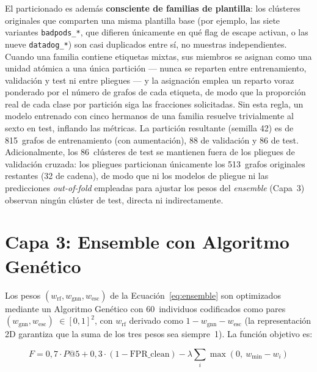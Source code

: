 El particionado es además \textbf{consciente de familias de plantilla}: los
clústeres originales que comparten una misma plantilla base (por ejemplo, las
siete variantes \texttt{badpods\_*}, que difieren únicamente en qué flag de
escape activan, o las nueve \texttt{datadog\_*}) son casi duplicados entre sí, no
muestras independientes. Cuando una familia contiene etiquetas mixtas, sus
miembros se asignan como una unidad atómica a una única partición — nunca se
reparten entre entrenamiento, validación y test ni entre pliegues — y la
asignación emplea un reparto voraz ponderado por el número de grafos de cada
etiqueta, de modo que la proporción real de cada clase por partición siga las
fracciones solicitadas. Sin esta regla, un modelo entrenado con cinco hermanos de
una familia resuelve trivialmente al sexto en test, inflando las métricas. La
partición resultante (semilla 42) es de 815~grafos de entrenamiento (con
aumentación), 88 de validación y 86 de test. Adicionalmente, los 86~clústeres de
test se mantienen fuera de los pliegues de validación cruzada: los pliegues
particionan únicamente los 513~grafos originales restantes (32 de cadena), de
modo que ni los modelos de pliegue ni las predicciones \textit{out-of-fold}
empleadas para ajustar los pesos del \textit{ensemble} (Capa~3) observan ningún
clúster de test, directa ni indirectamente.

\section{Capa 3: Ensemble con Algoritmo Genético}
\label{sec:capa3_diseno}

Los pesos \((w_{\text{rf}}, w_{\text{gnn}}, w_{\text{esc}})\) de la
Ecuación~\ref{eq:ensemble} son optimizados mediante un Algoritmo Genético
\citep{Holland1975} con 60~individuos codificados como pares
\((w_{\text{gnn}}, w_{\text{esc}})\) \(\in [0,1]^2\), con \(w_{\text{rf}}\) derivado
como \(1 - w_{\text{gnn}} - w_{\text{esc}}\) (la representación 2D garantiza que la
suma de los tres pesos sea siempre~1). La función objetivo es:

\begin{equation}
  F = 0{,}7 \cdot P@5 + 0{,}3 \cdot (1 - \text{FPR\_clean})
      - \lambda \sum_{i} \max(0,\ w_{\min} - w_i)
  \label{eq:ga_fitness}
\end{equation}


